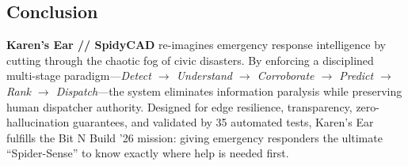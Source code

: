 \documentclass[10pt,a4paper]{article}
\begin{document}
\subsection{Conclusion}
\textbf{Karen's Ear // SpidyCAD} re-imagines emergency response intelligence by cutting through the chaotic fog of civic disasters. By enforcing a disciplined multi-stage paradigm---\emph{Detect $\rightarrow$ Understand $\rightarrow$ Corroborate $\rightarrow$ Predict $\rightarrow$ Rank $\rightarrow$ Dispatch}---the system eliminates information paralysis while preserving human dispatcher authority. Designed for edge resilience, transparency, zero-hallucination guarantees, and validated by 35 automated tests, Karen's Ear fulfills the Bit N Build '26 mission: giving emergency responders the ultimate ``Spider-Sense'' to know exactly where help is needed first.
\end{document}
